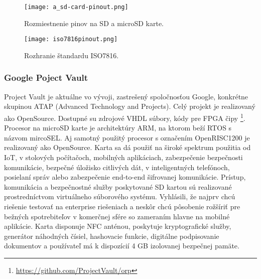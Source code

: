\documentclass[12pt,a4wide,oneside,openright]{report}
\begin{document}
\begin{figure*}[h]
	\centering
	\texttt{[image: a\_sd-card-pinout.png]}
	\caption{Rozmiestnenie pinov na SD a microSD karte. \cite{usdpinout}}
	\label{f:o_usd}
\end{figure*}

\begin{figure*}[h]
	\centering
	\texttt{[image: iso7816pinout.png]}
	\caption{Rozhranie štandardu ISO7816. \cite{iso7816pinout}}
	\label{f:o_ISO7816}
\end{figure*}


\subsubsection{Google Poject Vault} \label{s_sd_google}
Project Vault je aktuálne vo vývoji, zastrešený spoločnosťou Google, konkrétne skupinou ATAP (Advanced Technology and Projects). Celý projekt je realizovaný ako OpenSource. Dostupné su zdrojové VHDL súbory, kódy pre FPGA čipy \footnote{\url{https://github.com/ProjectVault/orp}}. Procesor na microSD karte je architektúry ARM, na ktorom beží RTOS s názvom mircoSEL. Aj samotný použitý procesor s označením OpenRISC1200 je realizovaný ako OpenSource. Karta sa dá použiť na široké spektrum použitia od IoT, v stolových počítačoch, mobilných aplikáciach, zabezpečenie bezpečnosti komunikácie, bezpečné úložisko citlivých dát, v inteligentných telefónoch, posielaní správ alebo zabezpečenie end-to-end šifrovanej komunikácie.
Prístup, komunikácia a bezpečnostné služby poskytované SD kartou sú realizované prostredníctvom virtuálneho súborového systému.
Vyhlásili, že najprv chcú riešenie testovať na enterprise riešeniach a neskôr chcú pôsobenie rožšíriť pre bežných spotrebiteľov v komerčnej sfére so zameraním hlavne na mobilné aplikácie.
Karta disponuje NFC anténou, poskytuje kryptografické služby, generátor náhodných čísiel, hashovacie funkcie, digitálne podpisovanie dokumentov a používateľ má k dispozícií 4 GB izolovanej bezpečnej pamäte\cite{googlevault}.
\end{document}
